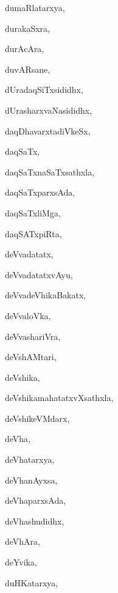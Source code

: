 \begin{multicols}{3}
{\noindent
{dumaRlatarxya}, \pageref{dumaRlatarxya}

\noindent
{durakaSxra}, \pageref{durakaSxra}

\noindent
{durAcAra}, \pageref{durAcAra}

\noindent
{duvARsane}, \pageref{duvARsane}

\noindent
{dUradaqSiTxsididhx}, \pageref{dUradaqSiTxsididhx}

\noindent
{dUrasharxvaNasididhx}, \pageref{dUrasharxvaNasididhx}

\noindent
{daqDhavarxtadiVkeSx}, \pageref{daqDhavarxtadiVkeSx}

\noindent
{daqSaTx}, \pageref{daqSaTx}

\noindent
{daqSaTxnaSaTxsathxla}, \pageref{daqSaTxnaSaTxsathxla}

\noindent
{daqSaTxparxsAda}, \pageref{daqSaTxparxsAda}

\noindent
{daqSaTxliMga}, \pageref{daqSaTxliMga}

\noindent
{daqSATxpiRta}, \pageref{daqSATxpiRta}

\noindent
{deVvadatatx}, \pageref{deVvadatatx}

\noindent
{deVvadatatxvAyu}, \pageref{deVvadatatxvAyu}

\noindent
{deVvadeVhikaBakatx}, \pageref{deVvadeVhikaBakatx}

\noindent
{deVvaloVka}, \pageref{deVvaloVka}

\noindent
{deVvashariVra}, \pageref{deVvashariVra}

\noindent
{deVshAMtari}, \pageref{deVshAMtari}

\noindent
{deVshika}, \pageref{deVshika}

\noindent
{deVshikamahatatxvXsathxla}, \pageref{deVshikamahatatxvXsathxla}

\noindent
{deVshikeVMdarx}, \pageref{deVshikeVMdarx}

\noindent
{deVha}, \pageref{deVha}

\noindent
{deVhatarxya}, \pageref{deVhatarxya}

\noindent
{deVhanAyxsa}, \pageref{deVhanAyxsa}

\noindent
{deVhaparxsAda}, \pageref{deVhaparxsAda}

\noindent
{deVhashudidhx}, \pageref{deVhashudidhx}

\noindent
{deVhAra}, \pageref{deVhAra}

\noindent
{deYvika}, \pageref{deYvika}

\noindent
{duHKatarxya}, \pageref{duHKatarxya}

}
\end{multicols}
